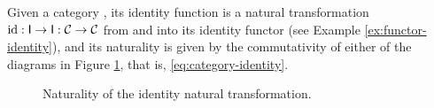 \begin{example}
  \label{ex:natural-identity}

  Given a category , its identity function is a natural
  transformation $\operatorname{id}: \mathsf{I} \to \mathsf{I}: \mathcal{C} \to \mathcal{C}$
  from and into its identity functor (see Example
  \ref{ex:functor-identity}), and its naturality is given by the
  commutativity of either of the diagrams in Figure
  \ref{fig:natural-identity}, that is, \eqref{eq:category-identity}.

  \begin{figure}[htb]
    \begin{subfigure}[b]{0.5\linewidth}
      \begin{center}
      \end{center}
    \end{subfigure}
    \begin{subfigure}[b]{0.5\linewidth}
      \begin{center}
      \end{center}
    \end{subfigure}
    \caption{Naturality of the identity natural transformation.}
    \label{fig:natural-identity}
  \end{figure}

\end{example}


